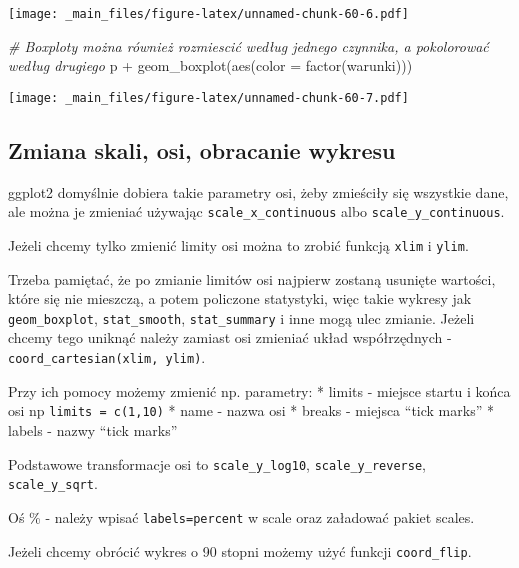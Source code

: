 \documentclass[
]{book}
\newenvironment{Shaded}{\begin{snugshade}}{\end{snugshade}}
\newcommand{\AttributeTok}[1]{\textcolor[rgb]{0.77,0.63,0.00}{#1}}
\newcommand{\CommentTok}[1]{\textcolor[rgb]{0.56,0.35,0.01}{\textit{#1}}}
\newcommand{\FunctionTok}[1]{\textcolor[rgb]{0.00,0.00,0.00}{#1}}
\newcommand{\NormalTok}[1]{#1}
\newcommand{\SpecialCharTok}[1]{\textcolor[rgb]{0.00,0.00,0.00}{#1}}
\begin{document}
\texttt{[image: \_main\_files/figure-latex/unnamed-chunk-60-6.pdf]}

\begin{Shaded}
\begin{Highlighting}[]
\CommentTok{\# Boxploty można również rozmiescić według jednego czynnika, a pokolorować według drugiego}
\NormalTok{p }\SpecialCharTok{+} \FunctionTok{geom\_boxplot}\NormalTok{(}\FunctionTok{aes}\NormalTok{(}\AttributeTok{color =} \FunctionTok{factor}\NormalTok{(warunki)))}
\end{Highlighting}
\end{Shaded}

\texttt{[image: \_main\_files/figure-latex/unnamed-chunk-60-7.pdf]}

\hypertarget{zmiana-skali-osi-obracanie-wykresu}{%
\subsection{Zmiana skali, osi, obracanie wykresu}\label{zmiana-skali-osi-obracanie-wykresu}}

ggplot2 domyślnie dobiera takie parametry osi, żeby zmieściły się wszystkie dane, ale można je zmieniać używając \texttt{scale\_x\_continuous} albo \texttt{scale\_y\_continuous}.

Jeżeli chcemy tylko zmienić limity osi można to zrobić funkcją \texttt{xlim} i \texttt{ylim}.

Trzeba pamiętać, że po zmianie limitów osi najpierw zostaną usunięte wartości, które się nie mieszczą, a potem policzone statystyki, więc takie wykresy jak \texttt{geom\_boxplot}, \texttt{stat\_smooth}, \texttt{stat\_summary} i inne mogą ulec zmianie. Jeżeli chcemy tego uniknąć należy zamiast osi zmieniać układ współrzędnych - \texttt{coord\_cartesian(xlim,\ ylim)}.

Przy ich pomocy możemy zmienić np. parametry:
* limits - miejsce startu i końca osi np \texttt{limits\ =\ c(1,10)}
* name - nazwa osi
* breaks - miejsca ``tick marks''
* labels - nazwy ``tick marks''

Podstawowe transformacje osi to \texttt{scale\_y\_log10}, \texttt{scale\_y\_reverse}, \texttt{scale\_y\_sqrt}.

Oś \% - należy wpisać \texttt{labels=percent} w scale oraz załadować pakiet scales.

Jeżeli chcemy obrócić wykres o 90 stopni możemy użyć funkcji \texttt{coord\_flip}.
\end{document}
